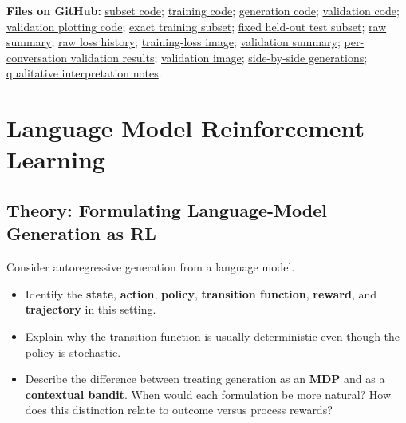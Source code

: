 {\textbf{Files on GitHub:} \href{https://github.com/SirNosh/LM-Agents-HW/blob/main/q5_prepare_data.py}{subset code}; \href{https://github.com/SirNosh/LM-Agents-HW/blob/main/q5_sft_lora.py}{training code}; \href{https://github.com/SirNosh/LM-Agents-HW/blob/main/q5_qualitative.py}{generation code}; \href{https://github.com/SirNosh/LM-Agents-HW/blob/main/q5_validate.py}{validation code}; \href{https://github.com/SirNosh/LM-Agents-HW/blob/main/q5_plot_validation.py}{validation plotting code}; \href{https://github.com/SirNosh/LM-Agents-HW/blob/main/data/ultrachat_train_1000_seed42.jsonl}{exact training subset}; \href{https://github.com/SirNosh/LM-Agents-HW/blob/main/data/ultrachat_test_100_seed42.jsonl}{fixed held-out test subset}; \href{https://github.com/SirNosh/LM-Agents-HW/blob/main/results/sft_lora_20260924_204124/summary.csv}{raw summary}; \href{https://github.com/SirNosh/LM-Agents-HW/blob/main/results/sft_lora_20260924_204124/training_metrics.csv}{raw loss history}; \href{https://github.com/SirNosh/LM-Agents-HW/blob/main/results/sft_lora_20260924_204124/training_loss.png}{training-loss image}; \href{https://github.com/SirNosh/LM-Agents-HW/blob/main/results/sft_lora_20260924_204124/validation_summary.csv}{validation summary}; \href{https://github.com/SirNosh/LM-Agents-HW/blob/main/results/sft_lora_20260924_204124/validation_per_conversation.csv}{per-conversation validation results}; \href{https://github.com/SirNosh/LM-Agents-HW/blob/main/results/sft_lora_20260924_204124/validation_loss.png}{validation image}; \href{https://github.com/SirNosh/LM-Agents-HW/blob/main/results/sft_lora_20260924_204124/qualitative_comparison.txt}{side-by-side generations}; \href{https://github.com/SirNosh/LM-Agents-HW/blob/main/q5_subset_behavior_notes.txt}{qualitative interpretation notes}.}


\section{Language Model Reinforcement Learning}

\subsection{Theory: Formulating Language-Model Generation as RL}
Consider autoregressive generation from a language model.

\begin{itemize}
    \item Identify the \textbf{state}, \textbf{action}, \textbf{policy}, \textbf{transition function}, \textbf{reward}, and \textbf{trajectory} in this setting.
    \item Explain why the transition function is usually deterministic even though the policy is stochastic.
    \item Describe the difference between treating generation as an \textbf{MDP} and as a \textbf{contextual bandit}. When would each formulation be more natural? How does this distinction relate to outcome versus process rewards?
\end{itemize}

